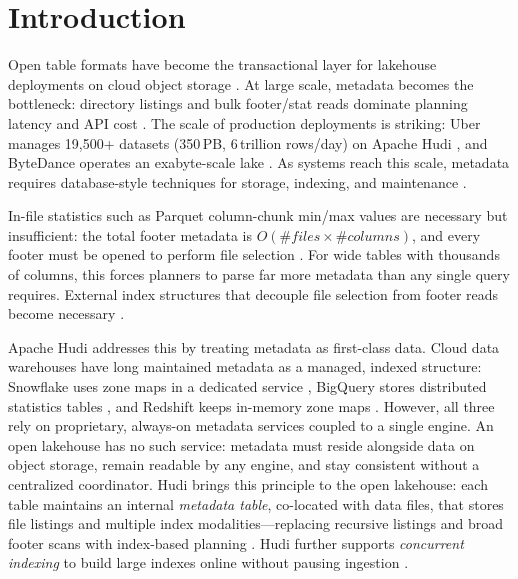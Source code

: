 \documentclass[sigconf]{acmart}
\begin{document}


\maketitle

\section{Introduction}
\label{sec:intro}

Open table formats have become the transactional layer for lakehouse deployments on cloud object storage \cite{zaharia2021lakehouse}.
At large scale, metadata becomes the bottleneck: directory listings and bulk footer/stat reads dominate planning latency and API cost \cite{armbrust2020deltalake}.
The scale of production deployments is striking: Uber manages 19,500+ datasets (350\,PB, 6\,trillion rows/day) on Apache Hudi \cite{uber-hudi-blog}, and ByteDance operates an exabyte-scale lake \cite{bytedance-hudi-blog}.
As systems reach this scale, metadata requires database-style techniques for storage, indexing, and maintenance \cite{edara2021bigmetadata}.

In-file statistics such as Parquet column-chunk min/max values are necessary but insufficient: the total footer metadata is $O(\#\textit{files} \times \#\textit{columns})$, and every footer must be opened to perform file selection \cite{zeng2024columnar}.
For wide tables with thousands of columns, this forces planners to parse far more metadata than any single query requires.
External index structures that decouple file selection from footer reads become necessary \cite{liu2023openformats}.

Apache Hudi addresses this by treating metadata as first-class data.
Cloud data warehouses have long maintained metadata as a managed, indexed structure: Snowflake uses zone maps in a dedicated service \cite{dageville2016snowflake}, BigQuery stores distributed statistics tables \cite{edara2021bigmetadata}, and Redshift keeps in-memory zone maps \cite{armenatzoglou2022redshift}. However, all three rely on proprietary, always-on metadata services coupled to a single engine.
An open lakehouse has no such service: metadata must reside alongside data on object storage, remain readable by any engine, and stay consistent without a centralized coordinator.
Hudi brings this principle to the open lakehouse: each table maintains an internal \emph{metadata table}, co-located with data files, that stores file listings and multiple index modalities---replacing recursive listings and broad footer scans with index-based planning \cite{hudi-metadata,onehouse-mmi}.
Hudi further supports \emph{concurrent indexing} to build large indexes online without pausing ingestion \cite{hudi-indexing}.
\end{document}

